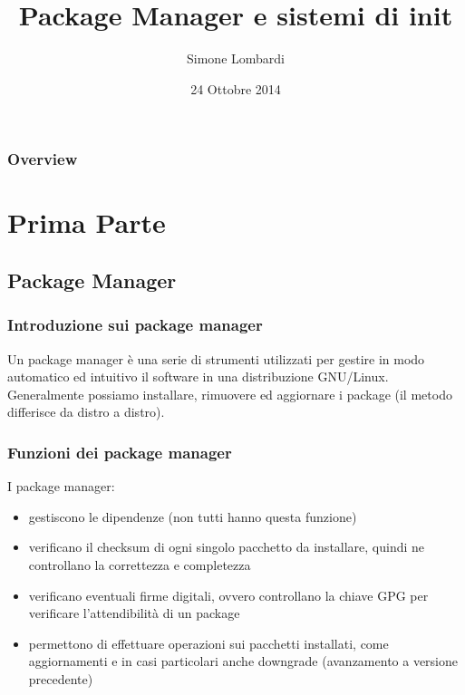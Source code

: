 \documentclass{beamer}
\title[Linux Day 2014]{Package Manager e sistemi di init}
\author{Simone Lombardi}
\institute[HCSSLUG] 
{
Universit\`a di Fisciano \\ 
\medskip
\textit{smlb@archlinux.info} 
}
\date{24 Ottobre 2014}
\begin{document}
\begin{frame}
\titlepage 
\end{frame}

\begin{frame}
\frametitle{Overview} 
\tableofcontents 
\end{frame}


\section{Prima Parte} 

\subsection{Package Manager} 

\begin{frame}
\frametitle{Introduzione sui package manager}
Un package manager \`e una serie di strumenti utilizzati per gestire in modo automatico ed intuitivo il software in una distribuzione GNU/Linux. Generalmente possiamo installare, rimuovere ed aggiornare i package (il metodo differisce da distro a distro). 
\end{frame}


\begin{frame}
	\frametitle{Funzioni dei package manager}
	I package manager:
	\begin{itemize}
		\item gestiscono le dipendenze (non tutti hanno questa funzione)
		\item verificano il checksum di ogni singolo pacchetto da installare, quindi ne controllano la correttezza e completezza
		\item verificano eventuali firme digitali, ovvero controllano la chiave GPG per verificare l'attendibilit\`a di un package
		\item permettono di effettuare operazioni sui pacchetti installati, come aggiornamenti e in casi particolari anche downgrade (avanzamento a versione precedente)
	\end{itemize}
\end{frame}
\end{document}
